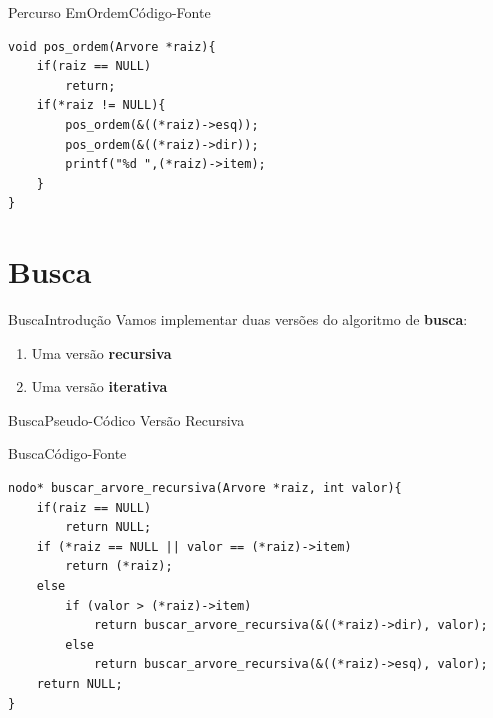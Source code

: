 \documentclass[aspectratio=169]{beamer}
\begin{document}

\begin{frame}[fragile]{Percurso EmOrdem}{Código-Fonte}
\begin{lstlisting}[style=CStyle,basicstyle=\small]
void pos_ordem(Arvore *raiz){
    if(raiz == NULL)
        return;
    if(*raiz != NULL){
        pos_ordem(&((*raiz)->esq));
        pos_ordem(&((*raiz)->dir));
        printf("%d ",(*raiz)->item);
    }
}
\end{lstlisting}  
\end{frame}

\section{Busca}

\begin{frame}{Busca}{Introdução}
Vamos implementar duas versões do algoritmo de {\bf busca}:
\begin{enumerate}
 \item Uma versão {\bf recursiva}
 \item Uma versão {\bf iterativa}
\end{enumerate}
\end{frame}


\begin{frame}{Busca}{Pseudo-Códico Versão Recursiva}
\begin{algorithm}[H]
\caption{Busca Recursiva} 
\label{Buscar}
\end{algorithm}
\end{frame}


\begin{frame}[fragile]{Busca}{Código-Fonte}
\begin{lstlisting}[style=CStyle,basicstyle=\small]
nodo* buscar_arvore_recursiva(Arvore *raiz, int valor){
    if(raiz == NULL)
        return NULL;
    if (*raiz == NULL || valor == (*raiz)->item)
    	return (*raiz);
    else
        if (valor > (*raiz)->item) 
            return buscar_arvore_recursiva(&((*raiz)->dir), valor);
        else 
            return buscar_arvore_recursiva(&((*raiz)->esq), valor);
    return NULL;
}
\end{lstlisting}  
\end{frame}
\end{document}
